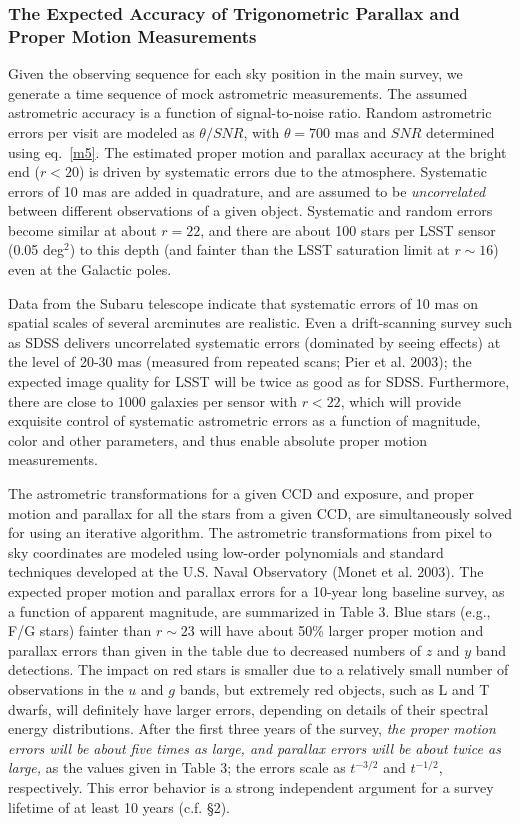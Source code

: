 \documentclass{emulateapj}
\begin{document}
\subsubsection{The Expected Accuracy of Trigonometric Parallax and Proper Motion Measurements } 

Given the observing sequence for each sky position in the main survey, we
generate a time sequence of mock astrometric measurements. The assumed astrometric 
accuracy is a function of signal-to-noise ratio. Random astrometric errors per
visit are modeled as $\theta/SNR$, with $\theta=700$ mas and $SNR$ determined using
eq.~\ref{m5}. The estimated proper motion and parallax accuracy at the bright end
($r<20$) is driven by systematic errors due to the atmosphere. Systematic
errors of 10 mas are added in quadrature, and are assumed to be {\it uncorrelated} 
between different observations of a given object. Systematic and random
errors become similar at about $r=22$, and there are about 100 stars per LSST 
sensor (0.05 deg$^2$) to this depth (and fainter than the LSST saturation limit at
$r\sim16$) even at the Galactic poles. 

Data from the Subaru telescope indicate that systematic errors of 
10 mas on spatial scales of several arcminutes are realistic. Even a drift-scanning 
survey such as SDSS delivers uncorrelated systematic errors (dominated by seeing 
effects) at the level of 20-30 mas (measured from repeated scans; Pier et al. 2003);
the expected image quality for LSST will be twice as good as for SDSS. Furthermore, 
there are close to 1000 galaxies per sensor with $r<22$, which will provide exquisite 
control of systematic astrometric errors as a function of magnitude, color and other 
parameters, and thus enable absolute proper motion measurements.

The astrometric transformations for a given CCD and exposure, and 
proper motion and parallax for all the stars from a given CCD, are simultaneously
solved for using an iterative algorithm. The astrometric transformations from
pixel to sky coordinates are modeled using low-order polynomials and standard
techniques developed at the U.S. Naval Observatory (Monet et al. 2003). The expected 
proper motion and 
parallax errors for a 10-year long baseline survey, as a function of apparent 
magnitude, are summarized in Table 3. Blue stars (e.g., F/G stars) fainter than 
$r\sim23$ will have about 50\% larger proper motion and parallax errors than 
given in the table due to decreased numbers of $z$ and $y$ band detections. The 
impact on red stars is smaller due to a relatively small number of observations 
in the $u$ and $g$ bands, but extremely red objects, such as L and T dwarfs, 
will definitely have larger errors, depending on details of their spectral 
energy distributions.  After the first three years of the survey, 
{\it the proper motion errors will be about five times as large, and parallax
errors will be about twice as large,} as the values given in Table 3; the errors
scale as $t^{-3/2}$ and $t^{-1/2}$, respectively. This error behavior is 
a strong independent argument for a survey lifetime of at least 10 years 
(c.f. \S 2).  
\end{document}
